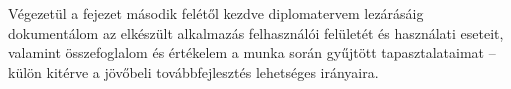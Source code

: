 Végezetül a  fejezet második felétől kezdve diplomatervem lezárásáig dokumentálom az elkészült alkalmazás felhasználói felületét és használati eseteit, valamint összefoglalom és értékelem a munka során gyűjtött tapasztalataimat -- külön kitérve a jövőbeli továbbfejlesztés lehetséges irányaira.